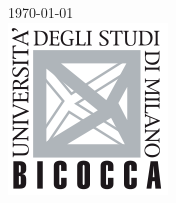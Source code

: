 \begin{titlepage}
{\large \today}\\[1cm] %


\includegraphics{logo.png}\\[1cm] %
 

\vfill %

\end{titlepage}


